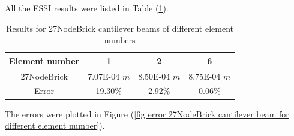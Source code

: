 \documentclass[fleqn,11pt,letter]{article}
\begin{document}




All the ESSI results were listed in Table (\ref{table 27NodeBrick cantilever beams results for different element number}). 
\begin{table}[H]
  \centering
      \caption{Results for 27NodeBrick cantilever beams of different element numbers}
    \label{table 27NodeBrick cantilever beams results for different element number}
    \begin{tabular}{|c|c|c|c|}
      \hline
      Element number & 1        & 2        & 6         \\  \hline
      27NodeBrick     & 7.07E-04 $m$ & 8.50E-04 $m$ & 8.75E-04 $m$     \\ \hline
      Error           & 19.30\%  & 2.92\%   & 0.06\%    \\ 
      \hline 
    \end{tabular}
\end{table}



The errors were plotted in Figure (\ref{fig error 27NodeBrick cantilever beam for different element number}).
\end{document}

